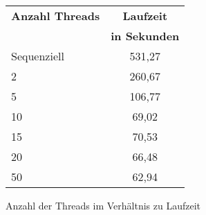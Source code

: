 \begin{figure}[!hbt]
\begin{minipage}[!hbt]{5cm}
\centering

        \begin{tabular}{ l  c }
            \toprule
            \textbf{Anzahl Threads} & \textbf{Laufzeit}\\
                                    & \textbf{in Sekunden}\\
            \midrule
            Sequenziell             & 531,27 \\
            2                       & 260,67 \\
            5                       & 106,77 \\
            10                      & 69,02 \\
            15                      & 70,53 \\
            20                      & 66,48 \\
            50                      & 62,94 \\
            \bottomrule
        \end{tabular}
      
\end{minipage}
\hfill
\begin{minipage}[!hbt]{8.2cm}
\centering
    
   
    \end{minipage}
     \caption{Anzahl der Threads im Verhältnis zu Laufzeit}\label{fig.laufzeitListe}
\end{figure}





%
%







